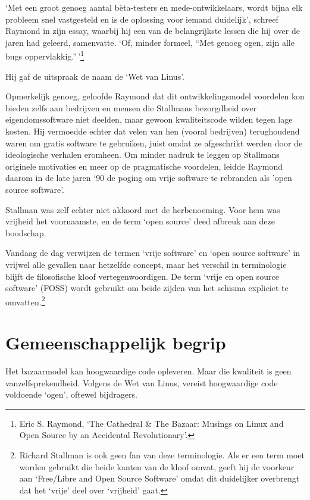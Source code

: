 \documentclass[smalldemyvopaper,11pt,twoside,onecolumn,openright,extrafontsizes,hidelinks]{memoir}
\begin{document}
`Met een groot genoeg aantal bèta-testers en mede-ontwikkelaars, wordt
bijna elk probleem snel vastgesteld en is de oplossing voor iemand
duidelijk', schreef Raymond in zijn essay, waarbij hij een van de
belangrijkste lessen die hij over de jaren had geleerd, samenvatte. `Of,
minder formeel, ``Met genoeg ogen, zijn alle bugs
oppervlakkig.''\,'\footnote{\hspace{0pt}Eric S. Raymond, `The Cathedral
  \& The Bazaar: Musings on Linux and Open Source by an Accidental
  Revolutionary'.}

Hij gaf de uitspraak de naam de `Wet van Linus'.

Opmerkelijk genoeg, geloofde Raymond dat dit ontwikkelingsmodel
voordelen kon bieden zelfs aan bedrijven en mensen die Stallmans
bezorgdheid over eigendomssoftware niet deelden, maar gewoon
kwaliteitscode wilden tegen lage kosten. Hij vermoedde echter dat velen
van hen (vooral bedrijven) terughoudend waren om gratis software te
gebruiken, juist omdat ze afgeschrikt werden door de ideologische
verhalen eromheen. Om minder nadruk te leggen op Stallmans originele
motivaties en meer op de pragmatische voordelen, leidde Raymond daarom
in de late jaren `90 de poging om vrije software te rebranden als 'open
source software'.

Stallman was zelf echter niet akkoord met de herbenoeming. Voor hem was
vrijheid het voornaamste, en de term `open source' deed afbreuk aan deze
boodschap.

Vandaag de dag verwijzen de termen `vrije software' en `open source
software' in vrijwel alle gevallen naar hetzelfde concept, maar het
verschil in terminologie blijft de filosofische kloof vertegenwoordigen.
De term `vrije en open source software' (FOSS) wordt gebruikt om beide
zijden van het schisma expliciet te omvatten.\footnote{Richard Stallman
  is ook geen fan van deze terminologie. Als er een term moet worden
  gebruikt die beide kanten van de kloof omvat, geeft hij de voorkeur
  aan `Free/Libre and Open Source Software' omdat dit duidelijker
  overbrengt dat het `vrije' deel over `vrijheid' gaat.}

\section{Gemeenschappelijk begrip}\label{gemeenschappelijk-begrip}

Het bazaarmodel kan hoogwaardige code opleveren. Maar die kwaliteit is
geen vanzelfsprekendheid. Volgens de Wet van Linus, vereist hoogwaardige
code voldoende `ogen', oftewel bijdragers.
\end{document}
